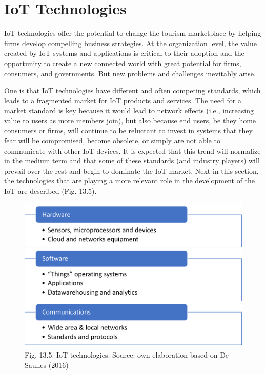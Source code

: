 \documentclass[
  letterpaper,
  DIV=11,
  numbers=noendperiod]{scrreprt}
\begin{document}
\hypertarget{iot-technologies}{%
\section{IoT Technologies}\label{iot-technologies}}

IoT technologies offer the potential to change the tourism marketplace
by helping firms develop compelling business strategies. At the
organization level, the value created by IoT systems and applications is
critical to their adoption and the opportunity to create a new connected
world with great potential for firms, consumers, and governments. But
new problems and challenges inevitably arise.

One is that IoT technologies have different and often competing
standards, which leads to a fragmented market for IoT products and
services. The need for a market standard is key because it would lead to
network effects (i.e., increasing value to users as more members join),
but also because end users, be they home consumers or firms, will
continue to be reluctant to invest in systems that they fear will be
compromised, become obsolete, or simply are not able to communicate with
other IoT devices. It is expected that this trend will normalize in the
medium term and that some of these standards (and industry players) will
prevail over the rest and begin to dominate the IoT market. Next in this
section, the technologies that are playing a more relevant role in the
development of the IoT are described (Fig. 13.5).

\begin{figure}

{\centering \includegraphics[width=6.25in,height=\textheight]{img/fig20.png}

}

\caption{Fig. 13.5. IoT technologies. Source: own elaboration based on
De Saulles (2016)}

\end{figure}
\end{document}
